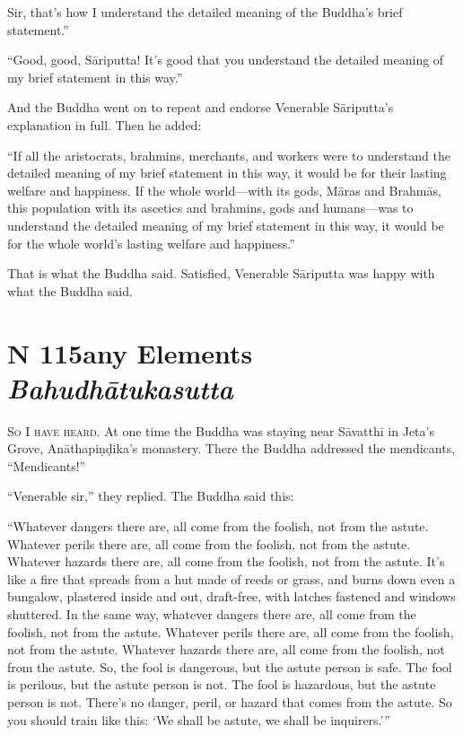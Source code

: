 \documentclass[12pt,openany]{book}%
\newcommand*{\suttatitleacronym}[1]{\smaller[2]{#1}\vspace*{.3em}}
\newcommand*{\suttatitletranslation}[1]{\linebreak{#1}}
\newcommand*{\suttatitleroot}[1]{\linebreak\smaller[2]\itshape{#1}}
\newcommand*{\tocacronym}[1]{\hspace*{-3.3em}{#1}\quad}
\newcommand*{\toctranslation}[1]{#1}
\newcommand*{\tocroot}[1]{(\textit{#1})}
\newcommand*{\scevam}[1]{\textsc{#1}}
\begin{document}
Sir, that’s how I understand the detailed meaning of the Buddha’s brief statement.” 

“Good, good, \textsanskrit{Sāriputta}! It’s good that you understand the detailed meaning of my brief statement in this way.” 

And the Buddha went on to repeat and endorse Venerable \textsanskrit{Sāriputta}’s explanation in full. Then he added: 

“If all the aristocrats, brahmins, merchants, and workers were to understand the detailed meaning of my brief statement in this way, it would be for their lasting welfare and happiness. If the whole world—with its gods, \textsanskrit{Māras} and \textsanskrit{Brahmās}, this population with its ascetics and brahmins, gods and humans—was to understand the detailed meaning of my brief statement in this way, it would be for the whole world’s lasting welfare and happiness.” 

That is what the Buddha said. Satisfied, Venerable \textsanskrit{Sāriputta} was happy with what the Buddha said. 

%
\section*{{\suttatitleacronym MN 115}{\suttatitletranslation Many Elements }{\suttatitleroot Bahudhātukasutta}}
\addcontentsline{toc}{section}{\tocacronym{MN 115} \toctranslation{Many Elements } \tocroot{Bahudhātukasutta}}

\scevam{So I have heard. }At one time the Buddha was staying near \textsanskrit{Sāvatthī} in Jeta’s Grove, \textsanskrit{Anāthapiṇḍika}’s monastery. There the Buddha addressed the mendicants, “Mendicants!” 

“Venerable sir,” they replied. The Buddha said this: 

“Whatever dangers there are, all come from the foolish, not from the astute. Whatever perils there are, all come from the foolish, not from the astute. Whatever hazards there are, all come from the foolish, not from the astute. It’s like a fire that spreads from a hut made of reeds or grass, and burns down even a bungalow, plastered inside and out, draft-free, with latches fastened and windows shuttered. In the same way, whatever dangers there are, all come from the foolish, not from the astute. Whatever perils there are, all come from the foolish, not from the astute. Whatever hazards there are, all come from the foolish, not from the astute. So, the fool is dangerous, but the astute person is safe. The fool is perilous, but the astute person is not. The fool is hazardous, but the astute person is not. There’s no danger, peril, or hazard that comes from the astute. So you should train like this: ‘We shall be astute, we shall be inquirers.’” 
\end{document}

